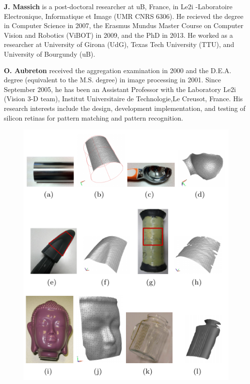 \documentclass[12pt]{spieman}
\begin{document}
\begin{spacing}{2}
\vspace{2ex}\noindent\textbf{J. Massich}  is a post-doctoral researcher at uB, France, in Le2i -Laboratoire Electronique, Informatique et Image (UMR CNRS 6306).
He recieved the degree in Computer Science in 2007, the Erasmus Mundus Master Course on Computer Vision and Robotics (ViBOT) in 2009, and the PhD in 2013.
He worked as a researcher at University of Girona (UdG), Texas Tech University (TTU), and University of Bourgundy (uB).

\vspace{2ex}\noindent\textbf{O. Aubreton} received the aggregation examination in 2000 and the D.E.A. degree (equivalent to the M.S. degree) in image processing in 2001.
Since September 2005, he has been an Assistant Professor with the Laboratory Le2i (Vision
3-D team), Institut Universitaire de Technologie,Le Creusot, France. His research interests include the design, development implementation, and testing of silicon retinas for pattern matching and pattern recognition.



\newpage
\listoffigures

\newpage
\listoftables

\newpage \begin{figure}\centering\includegraphics{Fig1}  


\end{figure}
\end{spacing}
\end{document}
